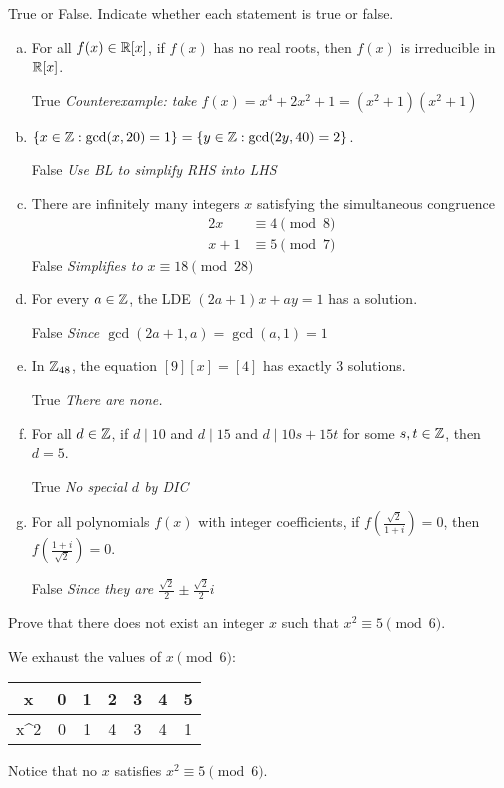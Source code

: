 \documentclass{agony}
\begin{document}
\begin{prob}
  True or False. Indicate whether each statement is true or false.
  \begin{enumerate}[(a)]
    \item For all $f(x) \in \mathbb{R}[x]$, if $f(x)$ has no real roots, then $f(x)$ is irreducible in $\mathbb{R}[x]$.

          True \quad {} \qquad \emph{Counterexample: take $f(x)=x^4+2x^2+1=(x^2+1)(x^2+1)$}
    \item $\{x \in \mathbb{Z} : \gcd(x,20) = 1\} = \{y \in \mathbb{Z} : \gcd(2y,40) = 2\}$.

           \quad False \qquad \emph{Use BL to simplify RHS into LHS}
    \item There are infinitely many integers $x$ satisfying the simultaneous congruence
          \begin{align*}
            2x & \equiv 4 \pmod 8 \\ x+1 & \equiv 5 \pmod 7
          \end{align*}
           \quad False \qquad \emph{Simplifies to $x \equiv 18 \pmod{28}$}
    \item For every $a\in\mathbb{Z}$, the LDE $(2a+1)x + ay = 1$ has a solution.

           \quad False \qquad \emph{Since $\gcd(2a+1,a) = \gcd(a,1) = 1$}
    \item In $\mathbb{Z}_{48}$, the equation $[9][x] = [4]$ has exactly 3 solutions.

          True \quad {} \qquad \emph{There are none.}
    \item For all $d \in \mathbb{Z}$, if $d \mid 10$ and $d \mid 15$
          and $d \mid 10s + 15t$ for some $s,t\in\mathbb{Z}$, then $d = 5$.

          True \quad {} \qquad \emph{No special $d$ by DIC}
    \item For all polynomials $f(x)$ with integer coefficients, if $f(\frac{\sqrt{2}}{1+i}) = 0$,
          then $f(\frac{1+i}{\sqrt{2}}) = 0$.

           \quad False \qquad \emph{Since they are $\frac{\sqrt{2}}{2} \pm \frac{\sqrt{2}}{2}i$}
  \end{enumerate}
\end{prob}

\begin{prob}
  Prove that there does not exist an integer $x$ such that $x^2 \equiv 5 \pmod 6$.
\end{prob}
\begin{prf}
  We exhaust the values of $x \pmod 6$:
  \begin{center}
    \begin{tabular}{C|C|C|C|C|C|C}
      x    & 0 & 1 & 2 & 3 & 4 & 5 \\ \hline
      x^2  & 0 & 1 & 4 & 3 & 4 & 1
    \end{tabular}
  \end{center}
  Notice that no $x$ satisfies $x^2 \equiv 5 \pmod 6$.
\end{prf}
\end{document}

